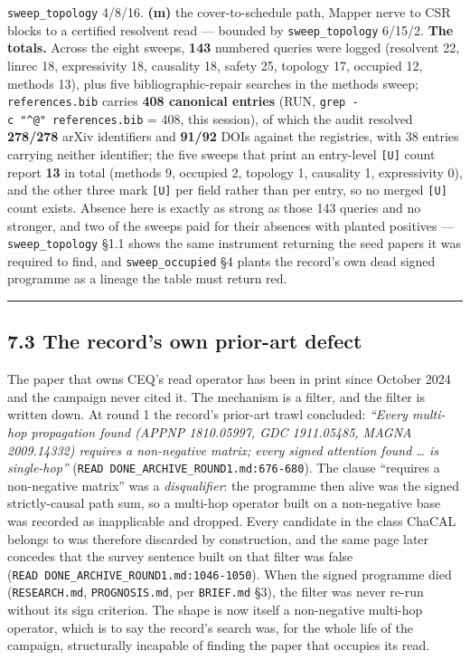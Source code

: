 \documentclass[11pt,a4paper]{article}
\theoremstyle{plain}
\theoremstyle{definition}
\theoremstyle{remark}
\begin{document}
\texttt{sweep\_topology} 4/8/16. \textbf{(m)} the cover-to-schedule
path, Mapper nerve to CSR blocks to a certified resolvent read ---
bounded by \texttt{sweep\_topology} 6/15/2. \textbf{The totals.} Across
the eight sweeps, \textbf{143} numbered queries were logged (resolvent
22, linrec 18, expressivity 18, causality 18, safety 25, topology 17,
occupied 12, methods 13), plus five bibliographic-repair searches in the
methods sweep; \texttt{references.bib} carries \textbf{408 canonical
entries} (RUN, \texttt{grep\ -c\ "\^{}@"\ references.bib} = 408, this
session), of which the audit resolved \textbf{278/278} arXiv identifiers
and \textbf{91/92} DOIs against the registries, with 38 entries carrying
neither identifier; the five sweeps that print an entry-level
\texttt{{[}U{]}} count report \textbf{13} in total (methods 9, occupied
2, topology 1, causality 1, expressivity 0), and the other three mark
\texttt{{[}U{]}} per field rather than per entry, so no merged
\texttt{{[}U{]}} count exists. Absence here is exactly as strong as
those 143 queries and no stronger, and two of the sweeps paid for their
absences with planted positives --- \texttt{sweep\_topology} §1.1 shows
the same instrument returning the seed papers it was required to find,
and \texttt{sweep\_occupied} §4 plants the record's own dead signed
programme as a lineage the table must return red.

\begin{center}\rule{0.5\linewidth}{0.5pt}\end{center}

\subsection{7.3 The record's own prior-art
defect}\label{the-records-own-prior-art-defect}

The paper that owns CEQ's read operator has been in print since October
2024 and the campaign never cited it. The mechanism is a filter, and the
filter is written down. At round 1 the record's prior-art trawl
concluded: \emph{``Every multi-hop propagation found (APPNP 1810.05997,
GDC 1911.05485, MAGNA 2009.14332) requires a non-negative matrix; every
signed attention found \ldots{} is single-hop''}
(\texttt{READ\ DONE\_ARCHIVE\_ROUND1.md:676-680}). The clause ``requires
a non-negative matrix'' was a \emph{disqualifier}: the programme then
alive was the signed strictly-causal path sum, so a multi-hop operator
built on a non-negative base was recorded as inapplicable and dropped.
Every candidate in the class ChaCAL belongs to was therefore discarded
by construction, and the same page later concedes that the survey
sentence built on that filter was false
(\texttt{READ\ DONE\_ARCHIVE\_ROUND1.md:1046-1050}). When the signed
programme died (\texttt{RESEARCH.md}, \texttt{PROGNOSIS.md}, per
\texttt{BRIEF.md} §3), the filter was never re-run without its sign
criterion. The shape is now itself a non-negative multi-hop operator,
which is to say the record's search was, for the whole life of the
campaign, structurally incapable of finding the paper that occupies its
read.
\end{document}
